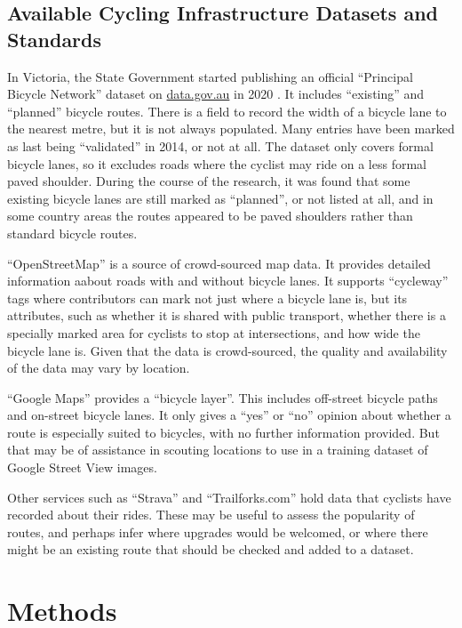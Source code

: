 \documentclass[11pt,twoside]{report}
\begin{document}
\section{Available Cycling Infrastructure Datasets and Standards}

In Victoria, the State Government started publishing an official ``Principal Bicycle Network'' dataset on \url{data.gov.au} in 2020 \cite{PrincipalBicycleNetwork}.  It includes ``existing'' and ``planned'' bicycle routes.  There is a field to record the width of a bicycle lane to the nearest metre, but it is not always populated.  Many entries have been marked as last being ``validated'' in 2014, or not at all.  The dataset only covers formal bicycle lanes, so it excludes roads where the cyclist may ride on a less formal paved shoulder.  During the course of the research, it was found that some existing bicycle lanes are still marked as ``planned'', or not listed at all, and in some country areas the routes appeared to be paved shoulders rather than standard bicycle routes.

``OpenStreetMap'' \cite{OPENSTREETMAP} is a source of crowd-sourced map data.  It provides detailed information aabout roads with and without bicycle lanes.  It supports ``cycleway'' tags where contributors can mark not just where a bicycle lane is, but its attributes, such as whether it is shared with public transport, whether there is a specially marked area for cyclists to stop at intersections, and how wide the bicycle lane is.  Given that the data is crowd-sourced, the quality and availability of the data may vary by location.

``Google Maps'' provides a ``bicycle layer''.  This includes off-street bicycle paths and on-street bicycle lanes.  It only gives a ``yes'' or ``no'' opinion about whether a route is especially suited to bicycles, with no further information provided.  But that may be of assistance in scouting locations to use in a training dataset of Google Street View images.

Other services such as ``Strava'' and ``Trailforks.com'' hold data that cyclists have recorded about their rides.  These may be useful to assess the popularity of routes, and perhaps infer where upgrades would be welcomed, or where there might be an existing route that should be checked and added to a dataset.


\chapter{Methods}
\end{document}
